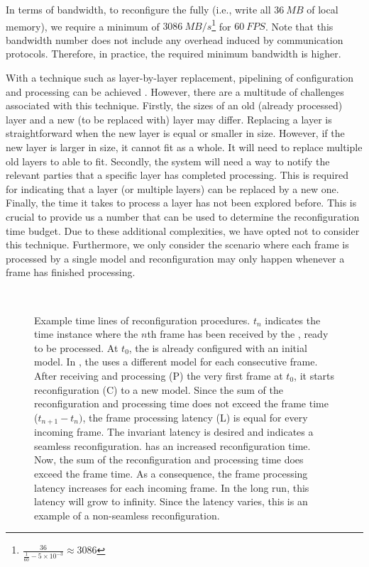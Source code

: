 In terms of bandwidth, to reconfigure the \graicore{} fully (i.e., write all $\SI{36}{MB}$ of local memory), we require a minimum of $\SI{3086}{MB/s}$\footnote{$\frac{36}{\frac{1}{60} - 5 \times 10^{-3}} \approx 3086$} for $\SI{60}{FPS}$.
Note that this bandwidth number does not include any overhead induced by communication protocols. Therefore, in practice, the required minimum bandwidth is higher. 

With a technique such as layer-by-layer replacement, pipelining of configuration and processing can be achieved \cite{jiDemandLayeringRealTime2022}.
However, there are a multitude of challenges associated with this technique. 
Firstly, the sizes of an old (already processed) layer and a new (to be replaced with) layer may differ.
Replacing a layer is straightforward when the new layer is equal or smaller in size.
However, if the new layer is larger in size, it cannot fit as a whole.
It will need to replace multiple old layers to able to fit.
Secondly, the system will need a way to notify the relevant parties that a specific layer has completed processing.
This is required for indicating that a layer (or multiple layers) can be replaced by a new one. %
Finally, the time it takes to process a layer has not been explored before.
This is crucial to provide us a number that can be used to determine the reconfiguration time budget.
Due to these additional complexities, we have opted not to consider this technique.
Furthermore, we only consider the scenario where each frame is processed by a single model and reconfiguration may only happen whenever a frame has finished processing.

\begin{figure}[htbp]
    \centering
    \subfloat[]{
        
        \label{fig:correct_reconfig}
    } \\
    \subfloat[]{
        
        \label{fig:incorrect_reconfig}
    }
    \caption{
    Example time lines of reconfiguration procedures.
    $t_n$ indicates the time instance where the $n$th frame has been received by the \graicore{}, ready to be processed.
    At $t_0$, the \graicore{} is already configured with an initial model.
    In \protect{}, the \graicore{} uses a different model for each consecutive frame.
    After receiving and processing (P) the very first frame at $t_0$, it starts reconfiguration (C) to a new model.
    Since the sum of the reconfiguration and processing time does not exceed the frame time ($t_{n+1} - t_{n})$, the frame processing latency (L) is equal for every incoming frame.
    The invariant latency is desired and indicates a seamless reconfiguration.
    \protect{} has an increased reconfiguration time.
    Now, the sum of the reconfiguration and processing time does exceed the frame time.
    As a consequence, the frame processing latency increases for each incoming frame.
    In the long run, this latency will grow to infinity.
    Since the latency varies, this is an example of a non-seamless reconfiguration.
    }
    \label{fig:reconfig_time_line_ex}
\end{figure}

